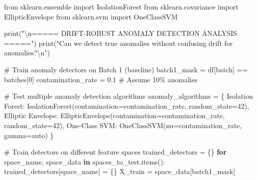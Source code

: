 \documentclass[
  letterpaper,
  DIV=11,
  numbers=noendperiod]{scrartcl}
\newenvironment{Shaded}{\begin{snugshade}}{\end{snugshade}}
\newcommand{\BuiltInTok}[1]{\textcolor[rgb]{0.00,0.23,0.31}{#1}}
\newcommand{\CharTok}[1]{\textcolor[rgb]{0.13,0.47,0.30}{#1}}
\newcommand{\CommentTok}[1]{\textcolor[rgb]{0.37,0.37,0.37}{#1}}
\newcommand{\ControlFlowTok}[1]{\textcolor[rgb]{0.00,0.23,0.31}{\textbf{#1}}}
\newcommand{\DecValTok}[1]{\textcolor[rgb]{0.68,0.00,0.00}{#1}}
\newcommand{\FloatTok}[1]{\textcolor[rgb]{0.68,0.00,0.00}{#1}}
\newcommand{\ImportTok}[1]{\textcolor[rgb]{0.00,0.46,0.62}{#1}}
\newcommand{\KeywordTok}[1]{\textcolor[rgb]{0.00,0.23,0.31}{\textbf{#1}}}
\newcommand{\NormalTok}[1]{\textcolor[rgb]{0.00,0.23,0.31}{#1}}
\newcommand{\OperatorTok}[1]{\textcolor[rgb]{0.37,0.37,0.37}{#1}}
\newcommand{\StringTok}[1]{\textcolor[rgb]{0.13,0.47,0.30}{#1}}
\renewenvironment{Shaded}{%
  \begin{tcolorbox}[%
    enhanced,%
    colback=codebg,%
    colframe=codebg,%
    borderline west={3pt}{0pt}{sectionblue},%
    fontupper=\small\ttfamily,%
    boxrule=0pt,%
    arc=0pt,%
    boxsep=5pt,%
    left=2mm,%
    right=2mm,%
    top=2mm,%
    bottom=2mm%
  ]%
}{%
  \end{tcolorbox}%
}
\begin{document}
\begin{Shaded}
\begin{Highlighting}[]
\ImportTok{from}\NormalTok{ sklearn.ensemble }\ImportTok{import}\NormalTok{ IsolationForest}
\ImportTok{from}\NormalTok{ sklearn.covariance }\ImportTok{import}\NormalTok{ EllipticEnvelope}
\ImportTok{from}\NormalTok{ sklearn.svm }\ImportTok{import}\NormalTok{ OneClassSVM}

\BuiltInTok{print}\NormalTok{(}\StringTok{"}\CharTok{\textbackslash{}n}\StringTok{===== DRIFT{-}ROBUST ANOMALY DETECTION ANALYSIS ====="}\NormalTok{)}
\BuiltInTok{print}\NormalTok{(}\StringTok{"Can we detect true anomalies without confusing drift for anomalies?}\CharTok{\textbackslash{}n}\StringTok{"}\NormalTok{)}

\CommentTok{\# Train anomaly detectors on Batch 1 (baseline)}
\NormalTok{batch1\_mask }\OperatorTok{=}\NormalTok{ df[}\StringTok{\textquotesingle{}batch\textquotesingle{}}\NormalTok{] }\OperatorTok{==}\NormalTok{ batches[}\DecValTok{0}\NormalTok{]}
\NormalTok{contamination\_rate }\OperatorTok{=} \FloatTok{0.1}  \CommentTok{\# Assume 10\% anomalies}

\CommentTok{\# Test multiple anomaly detection algorithms}
\NormalTok{anomaly\_algorithms }\OperatorTok{=}\NormalTok{ \{}
    \StringTok{\textquotesingle{}Isolation Forest\textquotesingle{}}\NormalTok{: IsolationForest(contamination}\OperatorTok{=}\NormalTok{contamination\_rate, random\_state}\OperatorTok{=}\DecValTok{42}\NormalTok{),}
    \StringTok{\textquotesingle{}Elliptic Envelope\textquotesingle{}}\NormalTok{: EllipticEnvelope(contamination}\OperatorTok{=}\NormalTok{contamination\_rate, random\_state}\OperatorTok{=}\DecValTok{42}\NormalTok{),}
    \StringTok{\textquotesingle{}One{-}Class SVM\textquotesingle{}}\NormalTok{: OneClassSVM(nu}\OperatorTok{=}\NormalTok{contamination\_rate, gamma}\OperatorTok{=}\StringTok{\textquotesingle{}auto\textquotesingle{}}\NormalTok{)}
\NormalTok{\}}

\CommentTok{\# Train detectors on different feature spaces}
\NormalTok{trained\_detectors }\OperatorTok{=}\NormalTok{ \{\}}
\ControlFlowTok{for}\NormalTok{ space\_name, space\_data }\KeywordTok{in}\NormalTok{ spaces\_to\_test.items():}
\NormalTok{    trained\_detectors[space\_name] }\OperatorTok{=}\NormalTok{ \{\}}
\NormalTok{    X\_train }\OperatorTok{=}\NormalTok{ space\_data[batch1\_mask]}
    

\end{Highlighting}
\end{Shaded}
\end{document}
